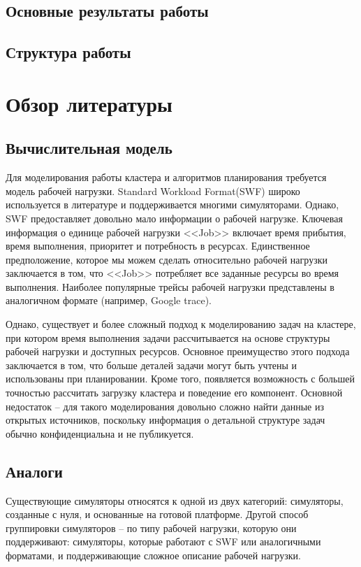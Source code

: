 \subsection{Основные результаты работы}

\subsection{Структура работы}

\section{Обзор литературы}

\subsection{Вычислительная модель}

Для моделирования работы кластера и алгоритмов планирования требуется модель рабочей нагрузки. Standard Workload Format(SWF)\cite{standard-workload-format} широко используется в литературе и поддерживается многими симуляторами. Однако, SWF предоставляет довольно мало информации о рабочей нагрузке. Ключевая информация о единице рабочей нагрузки <<Job>> включает время прибытия, время выполнения, приоритет и потребность в ресурсах. Единственное предположение, которое мы можем сделать относительно рабочей нагрузки заключается в том, что <<Job>> потребляет все заданные ресурсы во время выполнения. Наиболее популярные трейсы рабочей нагрузки представлены в аналогичном формате (например, Google trace\cite{google-clusterdata}).

Однако, существует и более сложный подход к моделированию задач на кластере, при котором время выполнения задачи рассчитывается на основе структуры рабочей нагрузки и доступных ресурсов. Основное преимущество этого подхода заключается в том, что больше деталей задачи могут быть учтены и использованы при планировании. Кроме того, появляется возможность с большей точностью рассчитать загрузку кластера и поведение его компонент. Основной недостаток -- для такого моделирования довольно сложно найти данные из открытых источников, поскольку информация о детальной структуре задач обычно конфиденциальна и не публикуется.

\subsection{Аналоги}

Существующие симуляторы относятся к одной из двух категорий: симуляторы, созданные с нуля, и основанные на готовой платформе. Другой способ группировки симуляторов -- по типу рабочей нагрузки, которую они поддерживают: симуляторы, которые работают с SWF или аналогичными форматами, и поддерживающие сложное описание рабочей нагрузки.


